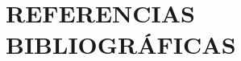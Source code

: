 \documentclass[11pt,a4paper]{report}
\begin{document}
\setlength\parskip{2.5mm}



\setlength\parskip{0mm}
\clearpage

\begin{spacing}{1.4}
\tableofcontents
\end{spacing}

\FloatBarrier
\listoffigures
\clearpage

\FloatBarrier
\listoftables
\clearpage

\setlength\parskip{2.5mm}
\newpage
{}
\titlespacing*{\chapter}{0pt}{40pt}{40pt}



\FloatBarrier
\begingroup
\chapter{\texorpdfstring{REFERENCIAS BIBLIOGRÁFICAS}{REFERENCIAS BIBLIOGRÁFICAS}}
\sloppy
\printbibliography[heading=none]
\endgroup

\clearpage
\FloatBarrier
{}
\begin{appendices}

\end{appendices}
\end{document}
